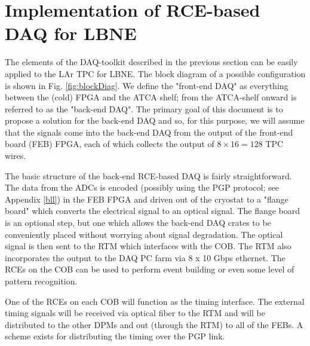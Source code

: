 \section{Implementation of RCE-based DAQ for LBNE}


The elements of the DAQ-toolkit described in the previous section can be easily applied to the LAr TPC for LBNE.  The block diagram of a possible configuration is shown in Fig. \ref{fig:blockDiag}.  We define the "front-end DAQ" as everything between the (cold) FPGA and the ATCA shelf; from the ATCA-shelf onward is referred to as the "back-end DAQ".    The primary goal of this document is to propose a solution for the back-end DAQ and so, for this purpose, we will assume that the signals come into the back-end DAQ from the output of the front-end board (FEB) FPGA, each of which collects the output of  $8\times 16 = 128$ TPC wires.  

The basic structure of the back-end RCE-based DAQ is fairly straightforward.  The data from the ADCs is encoded (possibly using the PGP protocol; see Appendix \ref{bll}) in the FEB FPGA and driven out of the cryostat to a "flange board" which converts the electrical signal to an optical signal.  The flange board is an optional step, but one which allows the back-end DAQ crates to be conveniently placed without worrying about signal degradation.   The optical signal is then sent to the RTM which interfaces with the COB.  The RTM also incorporates the output to the DAQ PC farm via 8 x 10 Gbps ethernet.  The RCEs on the COB can be used to perform event building or even some level of pattern recognition. 

One of the RCEs on each COB will function as the timing interface.  The  external timing  signals will be received via optical fiber to the RTM and will be distributed to the other DPMs and out (through the RTM) to all of the FEBs.  A scheme exists for distributing the timing over the PGP link.  





